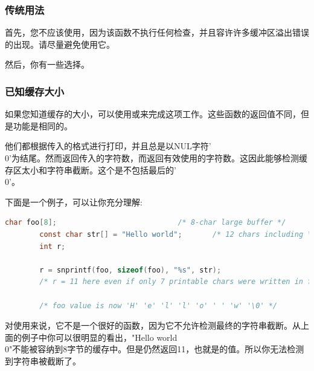 

\subsubsection{传统用法}

首先，您不应该使用，因为该函数不执行任何检查，并且容许许多缓冲区溢出错误的出现。请尽量避免使用它。


然后，你有一些选择。

\subsubsection{已知缓存大小}

如果您知道缓存的大小，可以使用或来完成这项工作。这些函数的返回值不同，但是功能是相同的。

他们都根据传入的格式进行打印，并且总是以NUL字符'\\0'为结尾。然而返回传入的字符数，而返回有效使用的字符数。这因此能够检测缓存区太小和字符串截断。这个是不包括最后的'\\0'。


下面是一个例子，可以让你充分理解:

\begin{lstlisting}[language=c]
        char foo[8];                            /* 8-char large buffer */
        const char str[] = "Hello world";       /* 12 chars including \0 in count */
        int r;

        r = snprintf(foo, sizeof(foo), "%s", str);
        /* r = 11 here even if only 7 printable chars were written in foo */

        /* foo value is now 'H' 'e' 'l' 'l' 'o' ' ' 'w' '\0' */
\end{lstlisting}  


对使用来说，它不是一个很好的函数，因为它不允许检测最终的字符串截断。从上面的例子中你可以很明显的看出，"Hello world\\0"不能被容纳到8字节的缓存中。但是仍然返回11，也就是的值。所以你无法检测到字符串被截断了。

